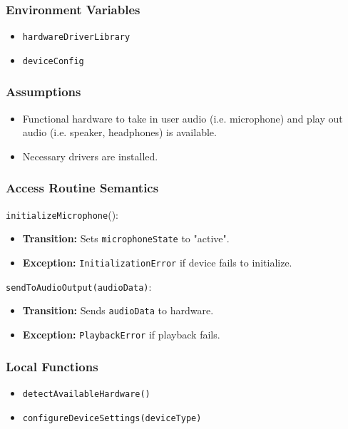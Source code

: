 \documentclass[12pt, titlepage]{article}
\begin{document}
\subsubsection{Environment Variables}  
\begin{itemize}  
    \item \texttt{hardwareDriverLibrary}  
    \item \texttt{deviceConfig}  
\end{itemize}  

\subsubsection{Assumptions}  
\begin{itemize}  
    \item Functional hardware to take in user audio (i.e. microphone) 
    and play out audio (i.e. speaker, headphones) is available.
    \item Necessary drivers are installed.  
\end{itemize}  

\subsubsection{Access Routine Semantics}  

\noindent \texttt{initializeMicrophone}():
\begin{itemize}  
    \item \textbf{Transition:} Sets \texttt{microphoneState} to "active".  
    \item \textbf{Exception:} \texttt{InitializationError} if device fails to initialize.  
\end{itemize}  

\noindent \texttt{sendToAudioOutput(audioData)}:
\begin{itemize}  
    \item \textbf{Transition:} Sends \texttt{audioData} to hardware.  
    \item \textbf{Exception:} \texttt{PlaybackError} if playback fails.  
\end{itemize}  

\subsubsection{Local Functions}  
\begin{itemize}  
    \item \texttt{detectAvailableHardware()}  
    \item \texttt{configureDeviceSettings(deviceType)}  
\end{itemize}  
\end{document}
